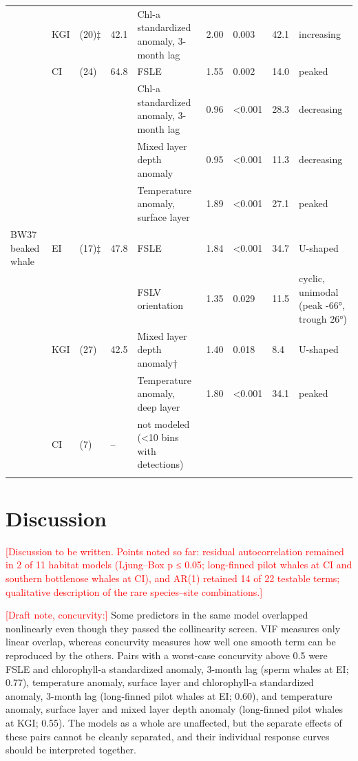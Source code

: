 \documentclass[
  11pt,
]{article}
\newcommand{\ins}[1]{\textcolor{red}{[#1]}}
\begin{document}
\begin{longtable}[t]{>{\raggedright\arraybackslash}p{1.9cm}l>{\raggedright\arraybackslash}p{1.3cm}l>{\raggedright\arraybackslash}p{3.6cm}lll>{\raggedright\arraybackslash}p{2.2cm}}
 & KGI & 56 (20)‡ & 42.1 & Chl-a standardized anomaly, 3-month lag & 2.00 & 0.003 & 42.1 & increasing\\
 & CI & 52 (24) & 64.8 & FSLE & 1.55 & 0.002 & 14.0 & peaked\\
 &  &  &  & Chl-a standardized anomaly, 3-month lag & 0.96 & <0.001 & 28.3 & decreasing\\
 &  &  &  & Mixed layer depth anomaly & 0.95 & <0.001 & 11.3 & decreasing\\
 &  &  &  & Temperature anomaly, surface layer & 1.89 & <0.001 & 27.1 & peaked\\
\midrule
BW37 beaked whale & EI & 34 (17)‡ & 47.8 & FSLE & 1.84 & <0.001 & 34.7 & U-shaped\\
 &  &  &  & FSLV orientation & 1.35 & 0.029 & 11.5 & cyclic, unimodal (peak -66°, trough 26°)\\
 & KGI & 56 (27) & 42.5 & Mixed layer depth anomaly† & 1.40 & 0.018 & 8.4 & U-shaped\\
 &  &  &  & Temperature anomaly, deep layer & 1.80 & <0.001 & 34.1 & peaked\\
 & CI & 52 (7) & -- & not modeled (<10 bins with detections) &  &  &  & \\*
\end{longtable}
\endgroup{}

\section{Discussion}\label{discussion}

\ins{Discussion to be written. Points noted so far: residual autocorrelation remained in 2 of 11 habitat models (Ljung--Box p ≤ 0.05; long-finned pilot whales at CI and southern bottlenose whales at CI), and AR(1) retained 14 of 22 testable terms; qualitative description of the rare species--site combinations.}

\ins{Draft note, concurvity:} Some predictors in the same model
overlapped nonlinearly even though they passed the collinearity screen.
VIF measures only linear overlap, whereas concurvity measures how well
one smooth term can be reproduced by the others. Pairs with a worst-case
concurvity above 0.5 were FSLE and chlorophyll-a standardized anomaly,
3-month lag (sperm whales at EI; 0.77), temperature anomaly, surface
layer and chlorophyll-a standardized anomaly, 3-month lag (long-finned
pilot whales at EI; 0.60), and temperature anomaly, surface layer and
mixed layer depth anomaly (long-finned pilot whales at KGI; 0.55). The
models as a whole are unaffected, but the separate effects of these
pairs cannot be cleanly separated, and their individual response curves
should be interpreted together.
\end{document}
